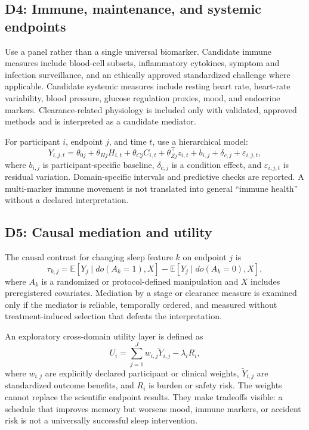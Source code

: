 \documentclass[conference]{IEEEtran}
\begin{document}
\subsection{D4: Immune, maintenance, and systemic endpoints}
Use a panel rather than a single universal biomarker. Candidate immune measures include blood-cell subsets, inflammatory cytokines, symptom and infection surveillance, and an ethically approved standardized challenge where applicable. Candidate systemic measures include resting heart rate, heart-rate variability, blood pressure, glucose regulation proxies, mood, and endocrine markers. Clearance-related physiology is included only with validated, approved methods and is interpreted as a candidate mediator.

For participant $i$, endpoint $j$, and time $t$, use a hierarchical model:
\begin{equation}
Y_{i,j,t}=\theta_{0j}+\theta_{Hj}H_{i,t}+\theta_{Cj}C_{i,t}+\theta_{Z j}^{\top}z_{i,t}+b_{i,j}+\delta_{c,j}+\varepsilon_{i,j,t},
\label{eq:outcome}
\end{equation}
where $b_{i,j}$ is participant-specific baseline, $\delta_{c,j}$ is a condition effect, and $\varepsilon_{i,j,t}$ is residual variation. Domain-specific intervals and predictive checks are reported. A multi-marker immune movement is not translated into general “immune health” without a declared interpretation.

\subsection{D5: Causal mediation and utility}
The causal contrast for changing sleep feature $k$ on endpoint $j$ is
\begin{equation}
\tau_{k,j}=\mathbb{E}[Y_j\mid do(A_k=1),X]-\mathbb{E}[Y_j\mid do(A_k=0),X],
\label{eq:causal}
\end{equation}
where $A_k$ is a randomized or protocol-defined manipulation and $X$ includes preregistered covariates. Mediation by a stage or clearance measure is examined only if the mediator is reliable, temporally ordered, and measured without treatment-induced selection that defeats the interpretation.

An exploratory cross-domain utility layer is defined as
\begin{equation}
U_i=\sum_{j=1}^{J}w_{i,j}\widetilde{Y}_{i,j}-\lambda_i R_i,
\label{eq:utility}
\end{equation}
where $w_{i,j}$ are explicitly declared participant or clinical weights, $\widetilde{Y}_{i,j}$ are standardized outcome benefits, and $R_i$ is burden or safety risk. The weights cannot replace the scientific endpoint results. They make tradeoffs visible: a schedule that improves memory but worsens mood, immune markers, or accident risk is not a universally successful sleep intervention.
\end{document}
